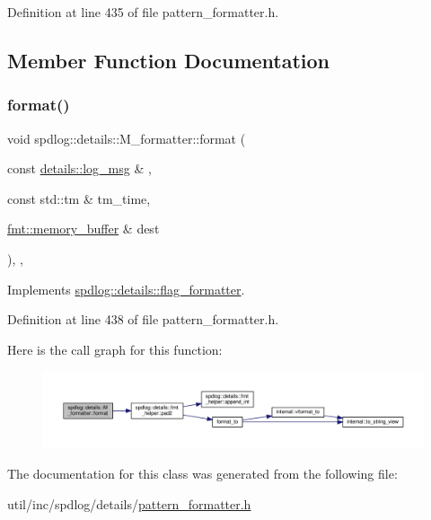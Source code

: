 Definition at line 435 of file pattern\+\_\+formatter.\+h.



\subsection{Member Function Documentation}
\mbox{\label{classspdlog_1_1details_1_1_m__formatter_ab6c0f013ea2c54cceb4561033d59ca0c}} 
\subsubsection{\texorpdfstring{format()}{format()}}
{\footnotesize\ttfamily void spdlog\+::details\+::\+M\+\_\+formatter\+::format (\begin{DoxyParamCaption}\item[{const \hyperlink{structspdlog_1_1details_1_1log__msg}{details\+::log\+\_\+msg} \&}]{,  }\item[{const std\+::tm \&}]{tm\+\_\+time,  }\item[{\hyperlink{format_8h_a21cbf729f69302f578e6db21c5e9e0d2}{fmt\+::memory\+\_\+buffer} \&}]{dest }\end{DoxyParamCaption})\hspace{0.3cm}{\ttfamily [inline]}, {\ttfamily [override]}, {\ttfamily [virtual]}}



Implements \hyperlink{classspdlog_1_1details_1_1flag__formatter_a33fb3e42a4c8200cceb833d92b53fb67}{spdlog\+::details\+::flag\+\_\+formatter}.



Definition at line 438 of file pattern\+\_\+formatter.\+h.

Here is the call graph for this function\+:
\nopagebreak
\begin{figure}[H]
\begin{center}
\leavevmode
\includegraphics[width=350pt]{classspdlog_1_1details_1_1_m__formatter_ab6c0f013ea2c54cceb4561033d59ca0c_cgraph}
\end{center}
\end{figure}


The documentation for this class was generated from the following file\+:\begin{DoxyCompactItemize}
\item 
util/inc/spdlog/details/\hyperlink{pattern__formatter_8h}{pattern\+\_\+formatter.\+h}\end{DoxyCompactItemize}
